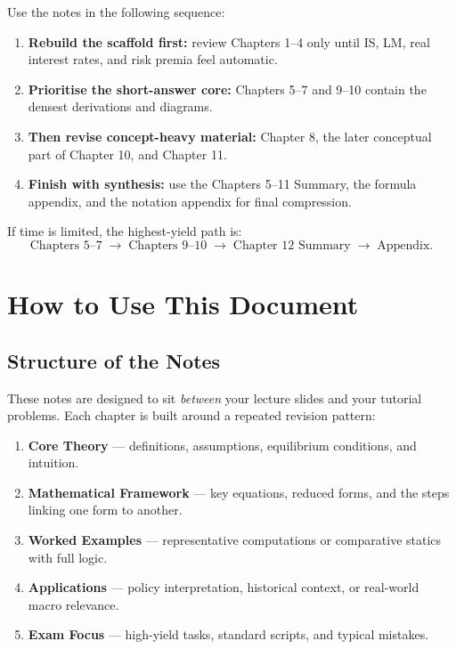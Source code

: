 \documentclass[12pt]{article}
\begin{document}
\begin{examtip}[title={Exam Focus: Recommended revision order}]
Use the notes in the following sequence:
\begin{enumerate}[leftmargin=1.5em]
\item \textbf{Rebuild the scaffold first:} review Chapters 1--4 only until IS, LM, real interest rates, and risk premia feel automatic.
\item \textbf{Prioritise the short-answer core:} Chapters 5--7 and 9--10 contain the densest derivations and diagrams.
\item \textbf{Then revise concept-heavy material:} Chapter 8, the later conceptual part of Chapter 10, and Chapter 11.
\item \textbf{Finish with synthesis:} use the Chapters 5--11 Summary, the formula appendix, and the notation appendix for final compression.
\end{enumerate}
If time is limited, the highest-yield path is:
\[
\text{Chapters 5--7} \;\rightarrow\; \text{Chapters 9--10} \;\rightarrow\; \text{Chapter 12 Summary} \;\rightarrow\; \text{Appendix}.
\]
\end{examtip}

\newpage

\section*{How to Use This Document}

\subsection*{Structure of the Notes}

These notes are designed to sit \emph{between} your lecture slides and your tutorial problems. Each chapter is built around a repeated revision pattern:

\begin{enumerate}
\item \textbf{Core Theory} --- definitions, assumptions, equilibrium conditions, and intuition.
\item \textbf{Mathematical Framework} --- key equations, reduced forms, and the steps linking one form to another.
\item \textbf{Worked Examples} --- representative computations or comparative statics with full logic.
\item \textbf{Applications} --- policy interpretation, historical context, or real-world macro relevance.
\item \textbf{Exam Focus} --- high-yield tasks, standard scripts, and typical mistakes.
\end{enumerate}
\end{document}
